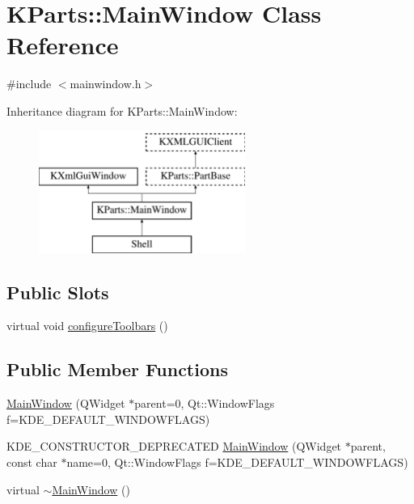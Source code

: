 \hypertarget{classKParts_1_1MainWindow}{\section{K\+Parts\+:\+:Main\+Window Class Reference}
\label{classKParts_1_1MainWindow}
}


{\ttfamily \#include $<$mainwindow.\+h$>$}

Inheritance diagram for K\+Parts\+:\+:Main\+Window\+:\begin{figure}[H]
\begin{center}
\leavevmode
\includegraphics[height=4.000000cm]{classKParts_1_1MainWindow}
\end{center}
\end{figure}
\subsection*{Public Slots}
\begin{DoxyCompactItemize}
\item 
virtual void \hyperlink{classKParts_1_1MainWindow_a06a7c6c817f9b280804b0cabd28b3696}{configure\+Toolbars} ()
\end{DoxyCompactItemize}
\subsection*{Public Member Functions}
\begin{DoxyCompactItemize}
\item 
\hyperlink{classKParts_1_1MainWindow_a0691c70bec34e706409f019b91ca3173}{Main\+Window} (Q\+Widget $\ast$parent=0, Qt\+::\+Window\+Flags f=K\+D\+E\+\_\+\+D\+E\+F\+A\+U\+L\+T\+\_\+\+W\+I\+N\+D\+O\+W\+F\+L\+A\+G\+S)
\item 
K\+D\+E\+\_\+\+C\+O\+N\+S\+T\+R\+U\+C\+T\+O\+R\+\_\+\+D\+E\+P\+R\+E\+C\+A\+T\+E\+D \hyperlink{classKParts_1_1MainWindow_ad157c37ff711ecd0784569acb2582e07}{Main\+Window} (Q\+Widget $\ast$parent, const char $\ast$name=0, Qt\+::\+Window\+Flags f=K\+D\+E\+\_\+\+D\+E\+F\+A\+U\+L\+T\+\_\+\+W\+I\+N\+D\+O\+W\+F\+L\+A\+G\+S)
\item 
virtual \hyperlink{classKParts_1_1MainWindow_a475129f2af4142fbe3612ec61ee411ef}{$\sim$\+Main\+Window} ()
\end{DoxyCompactItemize}
